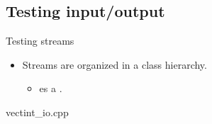\subsection{Testing input/output}

\begin{frame}[t]{Testing streams}
\begin{itemize}
  \item Streams are organized in a class hierarchy.
    \begin{itemize}
      \item {} es a .
    \end{itemize}
\end{itemize}
\vfill
\begin{block}{vectint\_io.cpp}

\end{block}
\end{frame}
